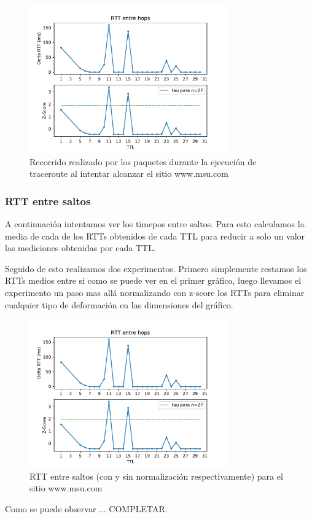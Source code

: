\begin{figure}[H]
  \centering
  \includegraphics[width=8.5cm]{figs/traceroute-moscow.pdf}
  \caption{\normalfont Recorrido realizado por los paquetes durante la ejecución de traceroute al intentar alcanzar el sitio www.msu.com}
\end{figure}

\subsubsection*{RTT entre saltos}

A continuación intentamos ver los timepos entre saltos. Para esto calculamos la media de cada de los RTTs obtenidos de cada TTL para reducir a solo un valor las mediciones obtenidas por cada TTL. 

Seguido de esto realizamos dos experimentos. Primero simplemente restamos los RTTs medios entre si como se puede ver en el primer gráfico, luego llevamos el experimento un paso mas allá normalizando con z-score los RTTs para eliminar cualquier tipo de deformación en las dimensiones del gráfico.

\begin{figure}[H]
  \centering
  \includegraphics[width=8.5cm]{figs/traceroute-moscow.pdf}
  \caption{\normalfont RTT entre saltos (con y sin normalización respectivamente) para el sitio www.msu.com}
\end{figure}

Como se puede observar ... COMPLETAR.